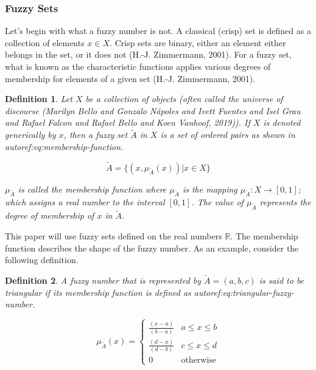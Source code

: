 \documentclass[11pt,a4paper,final]{article}
\newtheorem{definition}{Definition}[section]
\begin{document}
\subsubsection{Fuzzy Sets}
\label{sec:org76c07d1}
Let's begin with what a fuzzy number is not. A classical (crisp) set is defined as a collection of elements \(x \in X\).
Crisp sets are binary, either an element either belongs in the set, or it does not (H.-J. Zimmermann, 2001).
For a fuzzy set, what is known as the characteristic functions applies various degrees of membership for elements of a
given set (H.-J. Zimmermann, 2001).

\begin{definition}
Let \(X\) be a collection of objects (often called the universe of discourse (Marilyn Bello and Gonzalo N{\'a}poles and Ivett Fuentes and Isel Grau and Rafael Falcon and Rafael Bello and Koen Vanhoof, 2019)). If \(X\) is denoted
generically by \(x\), then a fuzzy set \(\tilde{A}\) in \(X\) is a set of ordered pairs as shown in autoref:eq:membership-function.

\begin{equation}
\label{eq:membership-function}
\tilde{A} = \{(x, \mu_{\tilde{A}}(x))| x\in X\}
\end{equation}

\noindent
\(\mu_{\tilde{A}}\) is called the membership function where \(\mu_{\tilde{A}}\) is the mapping \(\mu_{\tilde{A}} : X \rightarrow
[0,1]\); which assigns a real number to the interval \([0,1]\). The value of \(\mu_{\tilde{A}}\) represents the degree of
membership of \(x\) in \(\tilde{A}\).
\end{definition}

This paper will use fuzzy sets defined on the real numbers \(\mathbb{R}\). The membership function describes the shape of
the fuzzy number. As an example, consider the following definition.

\begin{definition}
A fuzzy number that is represented by \(\tilde{A} = (a,b,c)\) is said to be triangular if its membership function is
defined as autoref:eq:triangular-fuzzy-number.

\begin{equation}
\label{eq:triangular-fuzzy-number}
  \mu_{\tilde{A}}(x) =
  \begin{cases}
    \frac{(x-a)}{(b-a)} & a \le x \le b \\
    \frac{(d-x)}{(d-b)} & c \le x \le d \\
    0                   & \text{otherwise}
  \end{cases}
\end{equation}
\end{definition}
\end{document}
